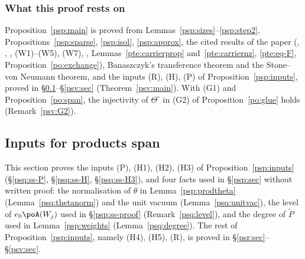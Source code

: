 \documentclass[10pt]{amsart}
\theoremstyle{definition}
\theoremstyle{remark}
\begin{document}
\subsubsection{What this proof rests on}\label{psp:ss-rest}

Proposition~\ref{psp:main} is proved from Lemmas~\ref{psp:sizes}--\ref{psp:step2},
Propositions~\ref{psp:sparse}, \ref{psp:isol}, \ref{psp:approx}, the cited results of the paper
({\cite[Lemma~13.4]{P46}}, {\cite[\S5]{P51}}, {\cite[Lemma~3.30]{P53}}, (W1)--(W5), (W7),
{\cite[Lemma~2.9]{P53}}, Lemmas~\ref{pte:carrierprop} and~\ref{pte:carriernz}, \eqref{pte:eq-F}, Proposition~\ref{po:exchange}),
Banaszczyk's transference theorem and the Stone--von Neumann theorem, and the inputs (R), (H), (P) of
Proposition~\ref{psp:inputs}, proved in \S\ref{psq:sec}--\S\ref{psv:sec} (Theorem~\ref{psv:main}). With (G1) and Proposition~\ref{po:span},
the injectivity of $\Theta^\circ$ in (G2) of Proposition~\ref{po:glue} holds (Remark~\ref{psv:G2}).



\providecommand{\auO}{\mathcal O}
\providecommand{\auU}{\mathrm U}
\providecommand{\auGL}{\mathrm{GL}}
\providecommand{\auA}{\mathbb A}
\providecommand{\auPl}{\Phi}
\providecommand{\aubar}[1]{\overline{#1}}
\providecommand{\pspl}{\lambda}
\providecommand{\pspG}{G_\infty}
\providecommand{\pspip}[2]{\langle #1,#2\rangle}
\providecommand{\psqH}{\mathfrak H}

\subsection{Inputs for products span}\label{psq:sec}

This section proves the inputs (P), (H1), (H2), (H3) of Proposition~\ref{psp:inputs}
(\S\ref{psq:ss-P}, \S\ref{psq:ss-H}, \S\ref{psq:ss-H3}), and four facts used in \S\ref{psp:sec}
without written proof: the normalisation of $\theta$ in Lemma~\ref{psp:prodtheta}
(Lemma~\ref{psq:thetanorm}) and the unit vacuum (Lemma~\ref{psq:unitvac}), the level of
$e_0\poA(W_j)$ used in \S\ref{psp:ss-proof} (Remark~\ref{psq:level}), and the degree of
$\widetilde P$ used in Lemma~\ref{psp:weights} (Lemma~\ref{psq:degree}). The rest of
Proposition~\ref{psp:inputs}, namely (H4), (H5), (R), is proved in \S\ref{psr:sec}--\S\ref{psv:sec}.
\end{document}
